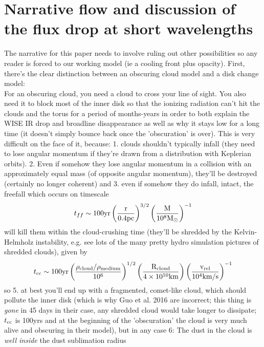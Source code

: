 \documentclass[12pt]{article}
\begin{document}
\section{Narrative flow and discussion of the flux drop at short wavelengths}
The narrative for this paper needs to involve ruling out other possibilities so any reader is forced to our working model (ie a cooling front plus opacity). First, there's the clear distinction between an obscuring cloud model and a disk change model:\\

For an obscuring cloud, you need a cloud to cross your line of sight. You also need it to block most of the inner disk so that the ionizing radiation can't hit the clouds and the torus for a period of months-years in order to both explain the WISE IR drop and broadline disappearance as well as why it stays low for a long time (it doesn't simply bounce back once the 'obscuration' is over). This is very difficult on the face of it, because: 1. clouds shouldn't typically infall (they need to lose angular momentum if they're drawn from a distribution with Keplerian orbits). 2. Even if somehow they lose angular momentum in a collision with an approximately equal mass (of opposite angular momentum), they'll be destroyed (certainly no longer coherent) and 3. even if somehow they do infall, intact, the freefall which occurs on timescale 
\begin{equation}
t_{ff} \sim 100 \rm{yr} \left(\frac{r}{0.4\rm{pc}}\right)^{3/2}\left(\frac{M}{10^{8}M_{\odot}}\right)^{-1}
\end{equation}
will kill them within the cloud-crushing time (they'll be shredded by the Kelvin-Helmholz instability, e.g. see lots of the many pretty hydro simulation pictures of shredded clouds), given by
\begin{equation}
t_{\rm cc} \sim 100\rm{yr} \left(\frac{\rho_{cloud}/\rho_{medium}}{10^{6}}\right)^{1/2}\left(\frac{R_{\rm cloud}}{4 \times 10^{10}\rm{km}}\right) \left(\frac{v_{\rm rel}}{10^{4}\rm{km/s}}\right)^{-1}
\end{equation}
 so 5. at best you'll end up with a fragmented, comet-like cloud, which should pollute the inner disk (which is why Guo et al. 2016 are incorrect; this thing is \emph{gone} in 45 days in their case, any shredded cloud would take longer to dissipate; $t_{\rm cc}$ is 100yrs and at the beginning of the 'obscuration' the cloud is very much alive and obscuring in their model), but in any case 6: The dust in the cloud is \emph{well inside} the dust sublimation radius
\end{document}
